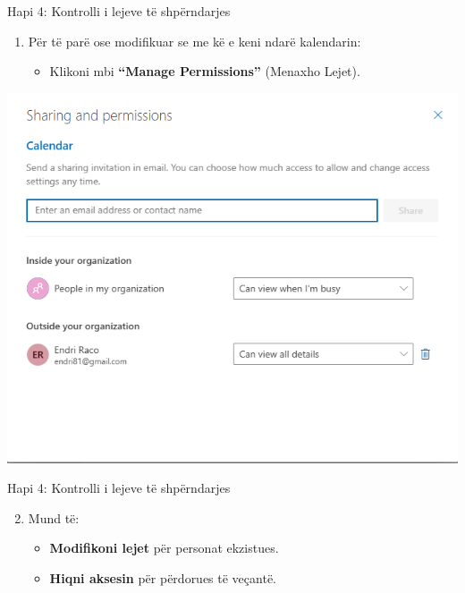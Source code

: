 \documentclass[
  ignorenonframetext,
]{beamer}
\providecommand{\tightlist}{%
  \setlength{\itemsep}{0pt}\setlength{\parskip}{0pt}}
\begin{document}
\begin{frame}{Hapi 4: Kontrolli i lejeve të shpërndarjes}
\label{hapi-4-kontrolli-i-lejeve-tuxeb-shpuxebrndarjes}
\begin{enumerate}
\item
  Për të parë ose modifikuar se me kë e keni ndarë kalendarin:

  \begin{itemize}
  \tightlist
  \item
    Klikoni mbi \textbf{``Manage Permissions''} (Menaxho Lejet).
  \end{itemize}
\end{enumerate}

\includegraphics{./images/outlook30.png}
\end{frame}

\begin{frame}{Hapi 4: Kontrolli i lejeve të shpërndarjes}
\label{hapi-4-kontrolli-i-lejeve-tuxeb-shpuxebrndarjes-1}
\begin{enumerate}
\setcounter{enumi}{1}
\item
  Mund të:

  \begin{itemize}
  \item
    \textbf{Modifikoni lejet} për personat ekzistues.
  \item
    \textbf{Hiqni aksesin} për përdorues të veçantë.
  \end{itemize}
\end{enumerate}
\end{frame}
\end{document}
